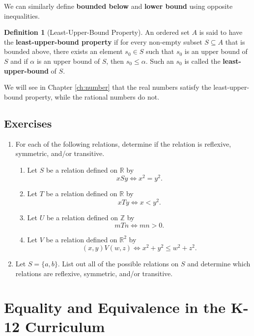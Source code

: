 \documentclass[
]{book}
\providecommand{\tightlist}{%
  \setlength{\itemsep}{0pt}\setlength{\parskip}{0pt}}
\theoremstyle{definition}
\newtheorem{definition}{Definition}[chapter]
\theoremstyle{definition}
\theoremstyle{definition}
\theoremstyle{remark}
\begin{document}
We can similarly define \textbf{bounded below} and \textbf{lower bound} using opposite inequalities.

\begin{definition}[Least-Upper-Bound Property]
\protect\hypertarget{def:unnamed-chunk-47}{}{\label{def:unnamed-chunk-47} {} }An ordered set \(A\) is said to have the \textbf{least-upper-bound property} if for every non-empty subset \(S\subseteq A\) that is bounded above, there exists an element \(s_0\in S\) such that \(s_0\) is an upper bound of \(S\) and if \(\alpha\) is an upper bound of \(S\), then \(s_0\leq \alpha\). Such an \(s_0\) is called the \textbf{least-upper-bound} of \(S\).
\end{definition}

We will see in Chapter \ref{ch:number} that the real numbers satisfy the least-upper-bound property, while the rational numbers do not.

\hypertarget{exercises-7}{%
\subsection{Exercises}\label{exercises-7}}

\begin{enumerate}
\def\labelenumi{\arabic{enumi}.}
\tightlist
\item
  For each of the following relations, determine if the relation is reflexive, symmetric, and/or transitive.

  \begin{enumerate}
  \def\labelenumii{\alph{enumii}.}
  \tightlist
  \item
    Let \(S\) be a relation defined on \(\mathbb{R}\) by \[xSy \Leftrightarrow x^2=y^2.\]
  \item
    Let \(T\) be a relation defined on \(\mathbb{R}\) by \[xTy \Leftrightarrow x<y^2.\]
  \item
    Let \(U\) be a relation defined on \(\mathbb{Z}\) by \[mTn \Leftrightarrow mn>0.\]
  \item
    Let \(V\) be a relation defined on \(\mathbb{R}^2\) by \[ (x,y)V(w,z) \Leftrightarrow x^2+y^2 \leq w^2+z^2.\]
  \end{enumerate}
\item
  Let \(S=\{a,b\}\). List out all of the possible relations on \(S\) and determine which relations are reflexive, symmetric, and/or transitive.
\end{enumerate}

\hypertarget{equality-and-equivalence-in-the-k-12-curriculum}{%
\section{Equality and Equivalence in the K-12 Curriculum}\label{equality-and-equivalence-in-the-k-12-curriculum}}
\end{document}
